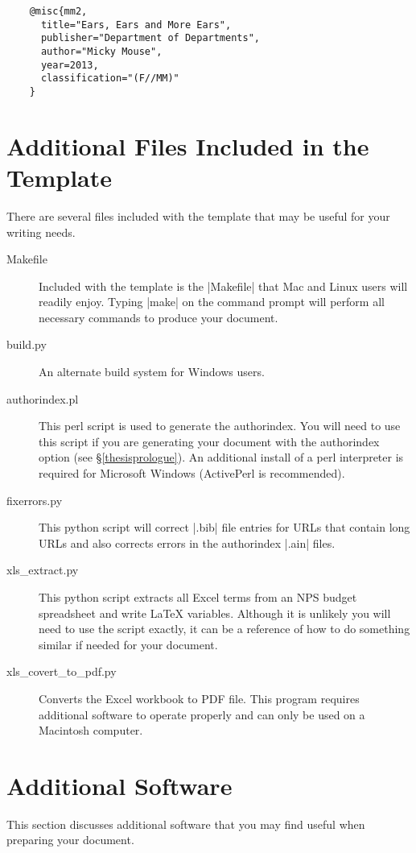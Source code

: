 \begin{Verbatim}
    @misc{mm2,
      title="Ears, Ears and More Ears",
      publisher="Department of Departments",
      author="Micky Mouse",
      year=2013,
      classification="(F//MM)"
    }
\end{Verbatim}

\section{Additional Files Included in the Template}
There are several files included with the template that may be useful for your writing needs.

\begin{description}
\item[Makefile] Included with the template is the |Makefile| that Mac and Linux users will readily enjoy.  Typing |make| on the command prompt will perform all necessary commands to produce your document.

\item[build.py] An alternate build system for Windows users.

\item[authorindex.pl] This perl script is used to generate the
  authorindex.  You will need to use this script if you are generating
  your document with the authorindex option (see
  \S\ref{thesisprologue}).  An additional install of a perl
  interpreter is required for Microsoft\textregistered{} Windows
  (ActivePerl\textregistered{} is recommended).

\item[fixerrors.py] This python script will correct |.bib| file entries for URLs that contain long URLs and also corrects errors in the authorindex |.ain| files.

\item[xls\_extract.py] This python script extracts all Excel terms from an NPS budget spreadsheet and write \LaTeX{} variables.
  Although it is unlikely you will need to use the script exactly, it can be a reference of how to do something similar if needed for your document.

\item[xls\_covert\_to\_pdf.py] Converts the Excel workbook to PDF
  file. This program requires additional software to operate properly
  and can only be used on a Macintosh computer.
\end{description}

\section{Additional Software}
This section discusses additional software that you may find useful
when preparing your document.
